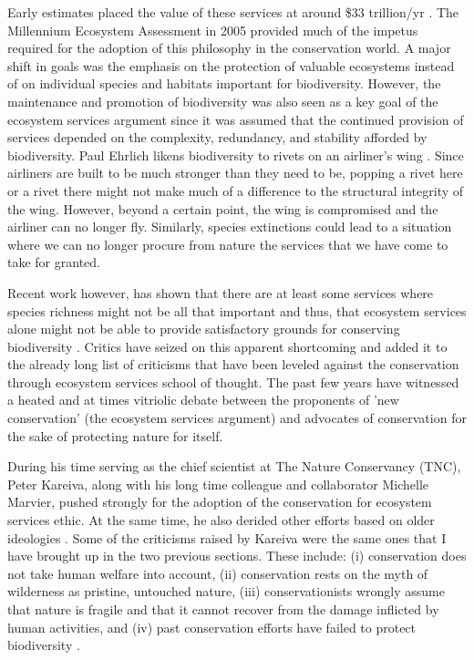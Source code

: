 \documentclass[rutwik_proposal.tex]{subfiles}
\begin{document}
Early estimates placed the value of these services at around \$33 trillion/yr \cite{dArge97}. The Millennium Ecosystem Assessment in 2005 provided much of the impetus required for the adoption of this philosophy in the conservation world. A major shift in goals was the emphasis on the protection of valuable ecosystems instead of on individual species and habitats important for biodiversity. However, the maintenance and promotion of biodiversity was also seen as a key goal of the ecosystem services argument since it was assumed that the continued provision of services depended on the complexity, redundancy, and stability afforded by biodiversity. Paul Ehrlich likens biodiversity to rivets on an airliner's wing \cite{Ehrlichs81}. Since airliners are built to be much stronger than they need to be, popping a rivet here or a rivet there might not make much of a difference to the structural integrity of the wing. However, beyond a certain point, the wing is compromised and the airliner can no longer fly. Similarly, species extinctions could lead to a situation where we can no longer procure from nature the services that we have come to take for granted.

Recent work however, has shown that there are at least some services where species richness might not be all that important and thus, that ecosystem services alone might not be able to provide satisfactory grounds for conserving biodiversity \cite{Winfree15, Ridder08}. Critics have seized on this apparent shortcoming and added it to the already long list of criticisms that have been leveled against the conservation through ecosystem services school of thought. The past few years have witnessed a heated and at times vitriolic debate between the proponents of 'new conservation' (the ecosystem services argument) and advocates of conservation for the sake of protecting nature for itself.

During his time serving as the chief scientist at The Nature Conservancy (TNC), Peter Kareiva, along with his long time colleague and collaborator Michelle Marvier, pushed strongly for the adoption of the conservation for ecosystem services ethic. At the same time, he also derided other efforts based on older ideologies \cite{Kareiva07, Kareiva12}. Some of the criticisms raised by Kareiva were the same ones that I have brought up in the two previous sections. These include: (i) conservation does not take human welfare into account, (ii) conservation rests on the myth of wilderness as pristine, untouched nature, (iii) conservationists wrongly assume that nature is fragile and that it cannot recover from the damage inflicted by human activities, and (iv) past conservation efforts have failed to protect biodiversity \cite{Kareiva07, Kareiva12}. 
\end{document}
